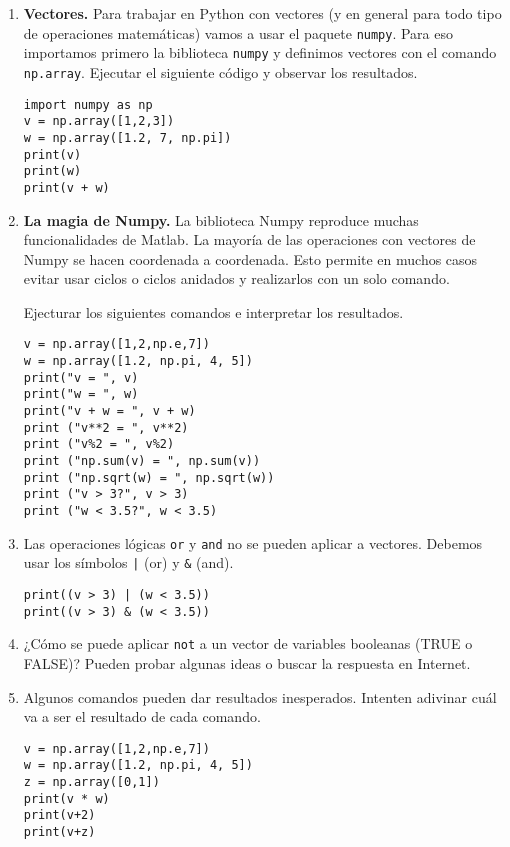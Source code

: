 \documentclass[a4paper,11pt]{article}
\theoremstyle{definition}
\begin{document}
\begin{enumerate}
\item \textbf{Vectores.}
Para trabajar  en Python con vectores (y en general para todo tipo de operaciones matemáticas) vamos a usar el paquete \lstinline{numpy}. Para eso importamos primero la biblioteca \lstinline{numpy} y definimos vectores con el comando \lstinline{np.array}. Ejecutar el siguiente c\'odigo y observar los resultados.

\begin{lstlisting}
import numpy as np
v = np.array([1,2,3])
w = np.array([1.2, 7, np.pi])
print(v)
print(w)
print(v + w)
\end{lstlisting}

\item \textbf{La magia de Numpy.} La biblioteca Numpy reproduce muchas funcionalidades de Matlab. La mayor\'ia de las operaciones con vectores de Numpy se hacen coordenada a coordenada. Esto permite en muchos casos evitar usar ciclos o ciclos anidados y realizarlos con un solo comando.

Ejecturar los siguientes comandos e interpretar los resultados.

\begin{lstlisting}
v = np.array([1,2,np.e,7])
w = np.array([1.2, np.pi, 4, 5])
print("v = ", v)
print("w = ", w)
print("v + w = ", v + w)
print ("v**2 = ", v**2)
print ("v%2 = ", v%2)
print ("np.sum(v) = ", np.sum(v))
print ("np.sqrt(w) = ", np.sqrt(w))
print ("v > 3?", v > 3)
print ("w < 3.5?", w < 3.5)
\end{lstlisting}

\item Las operaciones l\'ogicas \lstinline{or} y \lstinline{and} no se pueden aplicar a vectores. Debemos usar los s\'imbolos \lstinline{|} (or) y \lstinline{&} (and).
\begin{lstlisting}
print((v > 3) | (w < 3.5))
print((v > 3) & (w < 3.5))
\end{lstlisting}

\item ¿C\'omo se puede aplicar \lstinline{not} a un vector de variables booleanas (TRUE o FALSE)? Pueden probar algunas ideas o buscar la respuesta en Internet.

\item Algunos comandos pueden dar resultados inesperados. Intenten adivinar cuál va a ser el resultado de cada comando.
\begin{lstlisting}
v = np.array([1,2,np.e,7])
w = np.array([1.2, np.pi, 4, 5])
z = np.array([0,1])
print(v * w)
print(v+2)
print(v+z)
\end{lstlisting}


\end{enumerate}
\end{document}
